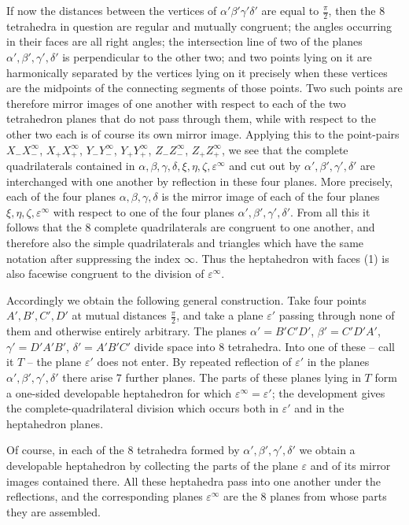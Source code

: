 \documentclass[11pt,a4paper]{article}
\begin{document}
If now the distances between the vertices of $\alpha'\beta'\gamma'\delta'$ are equal to $\frac{\pi}{2}$, then the $8$ tetrahedra in question are regular and mutually congruent; the angles occurring in their faces are all right angles; the intersection line of two of the planes $\alpha',\beta',\gamma',\delta'$ is perpendicular to the other two; and two points lying on it are harmonically separated by the vertices lying on it precisely when these vertices are the midpoints of the connecting segments of those points. Two such points are therefore mirror images of one another with respect to each of the two tetrahedron planes that do not pass through them, while with respect to the other two each is of course its own mirror image. Applying this to the point-pairs $X_-X_-^\infty$, $X_+X_+^\infty$, $Y_-Y_-^\infty$, $Y_+Y_+^\infty$, $Z_-Z_-^\infty$, $Z_+Z_+^\infty$, we see that the complete quadrilaterals contained in $\alpha,\beta,\gamma,\delta,\xi,\eta,\zeta,\varepsilon^\infty$ and cut out by $\alpha',\beta',\gamma',\delta'$ are interchanged with one another by reflection in these four planes. More precisely, each of the four planes $\alpha,\beta,\gamma,\delta$ is the mirror image of each of the four planes $\xi,\eta,\zeta,\varepsilon^\infty$ with respect to one of the four planes $\alpha',\beta',\gamma',\delta'$. From all this it follows that the $8$ complete quadrilaterals are congruent to one another, and therefore also the simple quadrilaterals and triangles which have the same notation after suppressing the index $\infty$. Thus the heptahedron with faces (1) is also facewise congruent to the division of $\varepsilon^\infty$.

Accordingly we obtain the following general construction. Take four points $A',B',C',D'$ at mutual distances $\frac{\pi}{2}$, and take a plane $\varepsilon'$ passing through none of them and otherwise entirely arbitrary. The planes $\alpha'=B'C'D'$, $\beta'=C'D'A'$, $\gamma'=D'A'B'$, $\delta'=A'B'C'$ divide space into $8$ tetrahedra. Into one of these -- call it $T$ -- the plane $\varepsilon'$ does not enter. By repeated reflection of $\varepsilon'$ in the planes $\alpha',\beta',\gamma',\delta'$ there arise $7$ further planes. The parts of these planes lying in $T$ form a one-sided developable heptahedron for which $\varepsilon^\infty=\varepsilon'$; the development gives the complete-quadrilateral division which occurs both in $\varepsilon'$ and in the heptahedron planes.

Of course, in each of the $8$ tetrahedra formed by $\alpha',\beta',\gamma',\delta'$ we obtain a developable heptahedron by collecting the parts of the plane $\varepsilon$ and of its mirror images contained there. All these heptahedra pass into one another under the reflections, and the corresponding planes $\varepsilon^\infty$ are the $8$ planes from whose parts they are assembled.
\end{document}
